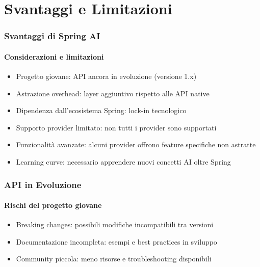 \section{Svantaggi e Limitazioni} %
\label{sec:spring_ai_disadvantages}
%
\begin{frame}[t,fragile] \frametitle{Svantaggi di Spring AI}
	{\small
		\framesubtitle{Considerazioni e limitazioni}
		\begin{itemize}[leftmargin=10pt,align=right]
			\onslide<1->\item[\alert{\faHandORight}] \alert{Progetto giovane:} API ancora in evoluzione (versione 1.x)
			\onslide<2->\item[\alert{\faHandORight}] \alert{Astrazione overhead:} layer aggiuntivo rispetto alle API native
			\onslide<3->\item[\alert{\faHandORight}] \alert{Dipendenza dall'ecosistema Spring:} lock-in tecnologico
			\onslide<4->\item[\alert{\faHandORight}] \alert{Supporto provider limitato:} non tutti i provider sono supportati
			\onslide<5->\item[\alert{\faHandORight}] \alert{Funzionalità avanzate:} alcuni provider offrono feature specifiche non astratte
			\onslide<6->\item[\alert{\faHandORight}] \alert{Learning curve:} necessario apprendere nuovi concetti AI oltre Spring
		\end{itemize}
	}
\end{frame}
%
\begin{frame}[t,fragile] \frametitle{API in Evoluzione}
	{\small
		\framesubtitle{Rischi del progetto giovane}
		\begin{itemize}[leftmargin=10pt,align=right]
			\onslide<2->\item[\alert{\faHandORight}] \alert{Breaking changes:} possibili modifiche incompatibili tra versioni
			\onslide<3->\item[\alert{\faHandORight}] \alert{Documentazione incompleta:} esempi e best practices in sviluppo
			\onslide<4->\item[\alert{\faHandORight}] \alert{Community piccola:} meno risorse e troubleshooting disponibili
		\end{itemize}
		\vspace*{.3cm}
	}
\end{frame}
